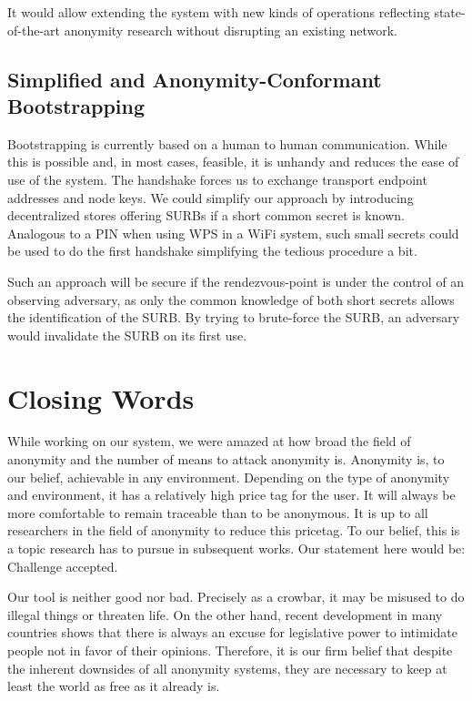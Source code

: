 It would allow extending the system with new kinds of operations reflecting state-of-the-art anonymity research without disrupting an existing network.

\section{Simplified and Anonymity-Conformant Bootstrapping}
Bootstrapping is currently based on a human to human communication. While this is possible and, in most cases, feasible, it is unhandy and reduces the ease of use of the system. The handshake forces us to exchange transport endpoint addresses and node keys. We could simplify our approach by introducing decentralized stores offering SURBs if a short common secret is known. Analogous to a PIN when using WPS in a WiFi system, such small secrets could be used to do the first handshake simplifying the tedious procedure a bit.

Such an approach will be secure if the rendezvous-point is under the control of an observing adversary, as only the common knowledge of both short secrets allows the identification of the SURB. By trying to brute-force the SURB, an adversary would invalidate the SURB on its first use.

\chapter{Closing Words}
While working on our system, we were amazed at how broad the field of anonymity and the number of means to attack anonymity is. Anonymity is, to our belief, achievable in any environment. Depending on the type of anonymity and environment, it has a relatively high price tag for the user. It will always be more comfortable to remain traceable than to be anonymous. It is up to all researchers in the field of anonymity to reduce this pricetag. To our belief, this is a topic research has to pursue in subsequent works. Our statement here would be: Challenge accepted.

Our tool is neither good nor bad. Precisely as a crowbar, it may be misused to do illegal things or threaten life. On the other hand, recent development in many countries shows that there is always an excuse for legislative power to intimidate people not in favor of their opinions. Therefore, it is our firm belief that despite the inherent downsides of all anonymity systems, they are necessary to keep at least the world as free as it already is.